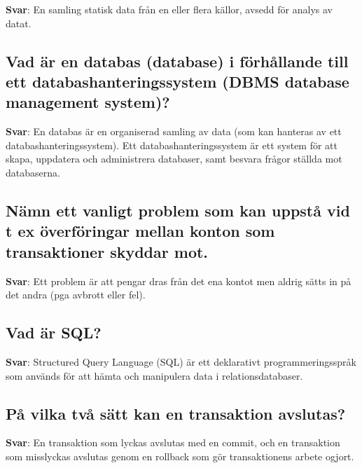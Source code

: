 \documentclass[a4paper,11pt,oneside]{article}
\begin{document}
\begin{sloppypar}
\label{q:281:sa:sv:True}

\textbf{Svar}: En samling statisk data fr\r{a}n en eller flera k\"allor, avsedd f\"or analys av datat.



\subsection{Vad \"ar en databas (database) i f\"orh\r{a}llande till ett databashanteringssystem (DBMS {\textendash} database management system)?}

\label{q:282:sa:sv:True}

\textbf{Svar}: En databas \"ar en organiserad samling av data (som kan hanteras av ett databashanteringssystem). Ett databashanteringssystem \"ar ett system f\"or att skapa, uppdatera och administrera databaser, samt besvara fr\r{a}gor st\"allda mot databaserna.



\subsection{N\"amn ett vanligt problem som kan uppst\r{a} vid t ex \"overf\"oringar mellan konton som transaktioner skyddar mot.}

\label{q:283:sa:sv:True}

\textbf{Svar}: Ett problem \"ar att pengar dras fr\r{a}n det ena kontot men aldrig s\"atts in p\r{a} det andra (pga avbrott eller fel).



\subsection{Vad \"ar SQL?}

\label{q:284:sa:sv:True}

\textbf{Svar}: Structured Query Language (SQL) \"ar ett deklarativt programmeringsspr\r{a}k som anv\"ands f\"or att h\"amta och manipulera data i relationsdatabaser.



\subsection{P\r{a} vilka tv\r{a} s\"att kan en transaktion avslutas?}

\label{q:285:sa:sv:True}

\textbf{Svar}: En transaktion som lyckas avslutas med en commit, och en transaktion som misslyckas avslutas genom en rollback som g\"or transaktionens arbete ogjort.




\end{sloppypar}
\end{document}
